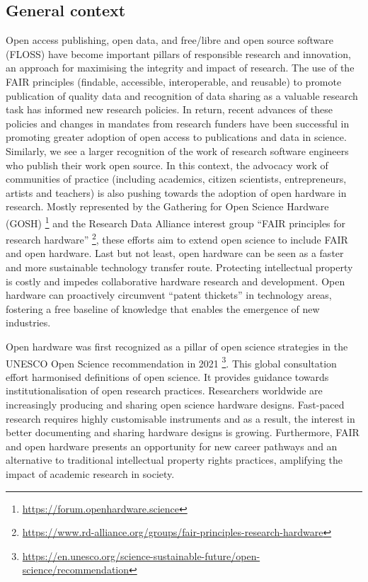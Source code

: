 \documentclass[
  12pt,
  a4paper,
]{article}
\begin{document}
\hypertarget{general-context}{%
\subsection{General context}\label{general-context}}

Open access publishing, open data, and free/libre and open source
software (FLOSS) have become important pillars of responsible research
and innovation, an approach for maximising the integrity and impact of
research. The use of the FAIR principles (findable, accessible,
interoperable, and reusable) to promote publication of quality data and
recognition of data sharing as a valuable research task has informed new
research policies. In return, recent advances of these policies and
changes in mandates from research funders have been successful in
promoting greater adoption of open access to publications and data in
science. Similarly, we see a larger recognition of the work of research
software engineers who publish their work open source. In this context,
the advocacy work of communities of practice (including academics,
citizen scientists, entrepreneurs, artists and teachers) is also pushing
towards the adoption of open hardware in research. Mostly represented by
the Gathering for Open Science Hardware (GOSH) \footnote{\url{https://forum.openhardware.science}}
and the Research Data Alliance interest group ``FAIR principles for
research hardware'' \footnote{\url{https://www.rd-alliance.org/groups/fair-principles-research-hardware}},
these efforts aim to extend open science to include FAIR and open
hardware. Last but not least, open hardware can be seen as a faster and
more sustainable technology transfer route. Protecting intellectual
property is costly and impedes collaborative hardware research and
development. Open hardware can proactively circumvent ``patent
thickets'' in technology areas, fostering a free baseline of knowledge
that enables the emergence of new industries.

Open hardware was first recognized as a pillar of open science
strategies in the UNESCO Open Science recommendation in 2021
\footnote{\url{https://en.unesco.org/science-sustainable-future/open-science/recommendation}}.
This global consultation effort harmonised definitions of open science.
It provides guidance towards institutionalisation of open research
practices. Researchers worldwide are increasingly producing and sharing
open science hardware designs. Fast-paced research requires highly
customisable instruments and as a result, the interest in better
documenting and sharing hardware designs is growing. Furthermore, FAIR
and open hardware presents an opportunity for new career pathways and an
alternative to traditional intellectual property rights practices,
amplifying the impact of academic research in society.
\end{document}
